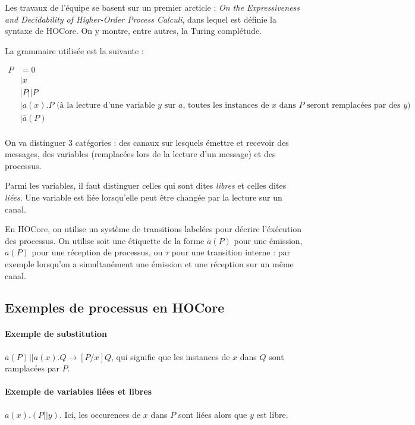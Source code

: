 \documentclass{article}
\begin{document}
Les travaux de l'équipe se basent sur un premier arcticle : \textit{On the Expressiveness and Decidability of Higher-Order Process Calculi}, dans lequel est définie la syntaxe de HOCore. On y montre, entre autres, la Turing complétude.

La grammaire utilisée est la suivante :

\begin{align*}
P &= 0 \\
&| x \\
&| P||P\\
&| a(x).P \text{ (à la lecture d'une variable $y$ sur $a$, toutes les instances de $x$ dans $P$ seront remplacées par des $y$)}\\
&| \bar{a}(P) \\
\end{align*}

On va distinguer 3 catégories : des canaux sur lesquels émettre et recevoir des messages, des variables (remplacées lors de la lecture d'un message) et des processus.

Parmi les variables, il faut distinguer celles qui sont dites \textit{libres} et celles dites \textit{liées}.
Une variable est liée lorsqu'elle peut être changée par la lecture sur un canal. 

En HOCore, on utilise un système de transitions labelées pour décrire l'éxécution des processus. On utilise soit une étiquette de la forme $\bar{a}(P)$ pour une émission, $a(P)$ pour une réception de processus, ou $\tau$ pour une transition interne : par exemple lorsqu'on a simultanément une émission et une réception sur un même canal.


\subsection{Exemples de processus en HOCore}
\paragraph{Exemple de substitution} $\bar{a}(P)||a(x).Q \rightarrow [P/x]Q$, qui signifie que les instances de $x$ dans $Q$ sont ramplacées par $P$.
\paragraph{Exemple de variables liées et libres} $a(x).(P||y)$. Ici, les occurences de $x$ dans $P$ sont liées alors que $y$ est libre. %
\end{document}
